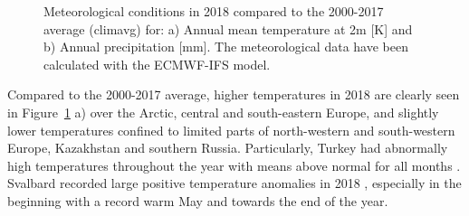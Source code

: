 \begin{figure}[h]
  \centering
  \caption{Meteorological conditions in 2018 compared to the 2000-2017 average (climavg) for: a) Annual mean temperature at 2m [K] and b) Annual precipitation [mm]. The meteorological data have been calculated with the ECMWF-IFS model.}
\label{fig:2018-avMET}
\end{figure}

Compared to the 2000-2017 average, higher temperatures in 2018 are clearly seen in Figure~\ref{fig:2018-avMET} a) over the Arctic, central and south-eastern Europe, and slightly lower temperatures 
confined to limited parts of north-western and south-western Europe, Kazakhstan and southern Russia. Particularly, Turkey had abnormally high temperatures throughout the year with means above normal for all months \citep{Sensoy:Turkey2018}.
Svalbard recorded large positive temperature anomalies in 2018 \citep{Overland:ARC2018}, especially in the beginning with a record warm May and towards the end of the year.

